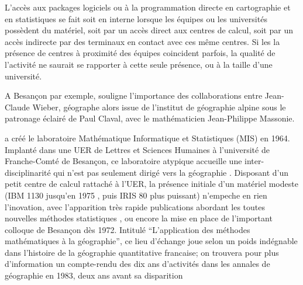 




L’accès aux packages logiciels ou à la programmation directe en cartographie et en statistiques se fait soit en interne lorsque les équipes ou les universités possèdent du matériel, soit par un accès direct aux centres de calcul, soit par un accès indirecte par des terminaux en contact avec ces même centres. Si les la présence de centres à proximité des équipes coincident parfois, la qualité de l'activité ne saurait se rapporter à cette seule présence, ou à la taille d'une université. \autocites{Wieber1980}[448]{Joliveau2004}

A Besançon par exemple, \textcite[131]{Cuyala2014} souligne l’importance des collaborations entre Jean-Claude Wieber, géographe alors issue de l’institut de géographie alpine sous le patronage éclairé de Paul Claval, avec le mathématicien Jean-Philippe Massonie.  

\textcite{Massonie1986} a créé le laboratoire Mathématique Informatique et Statistiques (MIS) en 1964. Implanté dans une UER de Lettres et Sciences Humaines à l’université de Franche-Comté de Besançon, ce laboratoire atypique accueille une inter-disciplinarité qui n'est pas seulement dirigé vers la géographie . Disposant d’un petit centre de calcul rattaché à l'UER, la présence initiale d'un matériel modeste (IBM 1130 jusqu'en 1975 \autocite[22]{Wieber1980}, puis IRIS 80 plus puissant) n'empeche en rien l'inovation, avec l'apparition très rapide publications abordant les toutes nouvelles méthodes statistiques \autocite{Massonie1971}, ou encore la mise en place de l'important colloque de Besançon dès 1972. Intitulé \enquote{L'application des méthodes mathématiques à la géographie}, ce lieu d'échange joue selon \autocite[331]{Cuyala2014} un poids indégnable dans l'histoire de la géographie quantitative francaise; on trouvera pour plus d'information un compte-rendu des dix ans d'activités dans les annales de géographie en 1983, deux ans avant sa disparition \autocite{Massonie1983}

